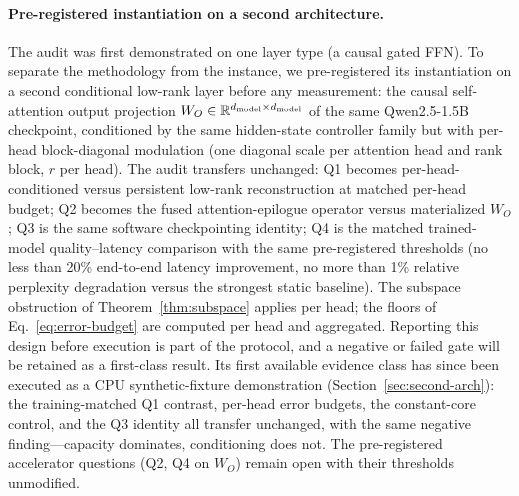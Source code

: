 \paragraph{Pre-registered instantiation on a second architecture.}
The audit was first demonstrated on one layer type (a causal gated FFN). To
separate the methodology from the instance, we pre-registered its
instantiation on a second conditional low-rank layer before any measurement:
the causal self-attention output projection
$W_O\in\mathbb{R}^{d_{\rm model}\times d_{\rm model}}$ of the same Qwen2.5-1.5B
checkpoint, conditioned by the same hidden-state controller family but with
per-head block-diagonal modulation (one diagonal scale per attention head and
rank block, $r$ per head). The audit transfers unchanged: Q1 becomes
per-head-conditioned versus persistent low-rank reconstruction at matched
per-head budget; Q2 becomes the fused attention-epilogue operator versus
materialized $W_O$; Q3 is the same software checkpointing identity; Q4 is the
matched trained-model quality--latency comparison with the same
pre-registered thresholds (no less than 20\% end-to-end latency improvement,
no more than 1\% relative perplexity degradation versus the strongest static
baseline). The subspace obstruction of Theorem~\ref{thm:subspace} applies per
head; the floors of Eq.~\eqref{eq:error-budget} are computed per head and
aggregated. Reporting this design before execution is part of the protocol,
and a negative or failed gate will be retained as a first-class result. Its
first available evidence class has since been executed as a CPU
synthetic-fixture demonstration (Section~\ref{sec:second-arch}): the
training-matched Q1 contrast, per-head error budgets, the constant-core
control, and the Q3 identity all transfer unchanged, with the same negative
finding---capacity dominates, conditioning does not. The pre-registered
accelerator questions (Q2, Q4 on $W_O$) remain open with their thresholds
unmodified.

